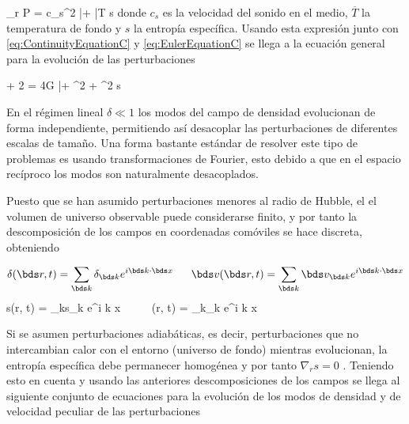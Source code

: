 { \nabla_r P = c_s^2 \bar \rho \nabla \delta + 
\bar T \rho \nabla s }
donde $c_s$ es la velocidad del sonido en el medio, $\overline T$ la 
temperatura de fondo y $s$ la entropía específica. Usando esta expresión 
junto con \ref{eq:ContinuityEquationC} y \ref{eq:EulerEquationC} se llega
a la ecuación general para la evolución de las perturbaciones


{  + 2  = 
4\pi G \bar \rho \delta + \nabla^2 \delta +
\nabla^2 s }


En el régimen lineal $\delta \ll 1$ los modos del campo de densidad 
evolucionan de forma independiente, permitiendo así desacoplar las
perturbaciones de diferentes escalas de tamaño. Una forma bastante estándar 
de resolver este tipo de problemas es usando transformaciones de Fourier, 
esto debido a que en el espacio recíproco los modos son naturalmente 
desacoplados.


Puesto que se han asumido perturbaciones menores al radio de Hubble, el
el volumen de universo observable puede considerarse finito, y por tanto 
la descomposición de los campos en coordenadas comóviles se hace discreta, 
obteniendo


\[  \delta(\bds r, t) =  \sum_{\bds k}\delta_{\bds k} e^{i \bds k \cdot \bds x} 
\ \ \ \ \ 
	\bds v(\bds r, t) =  \sum_{\bds k}\bds v_{\bds k} e^{i \bds k \cdot \bds x}\]
\eq{eq:FourierFields}
{  s(\bds r, t) =  \sum_{\bds k}s_{\bds k} e^{i \bds k \cdot \bds x} 
\ \ \ \ \ 
	\Phi(\bds r, t) =  \sum_{\bds k}\Phi_{\bds k} e^{i \bds k \cdot \bds x}}


Si se asumen perturbaciones adiabáticas, es decir, perturbaciones que no 
intercambian calor con el entorno (universo de fondo) mientras evolucionan,
la entropía específica debe permanecer homogénea y por tanto $\nabla_r s = 0$
\cite{longair2008}. Teniendo esto en cuenta y usando las anteriores 
descomposiciones de los campos se llega al siguiente conjunto de ecuaciones
para la evolución de los modos de densidad y de velocidad peculiar de las 
perturbaciones


